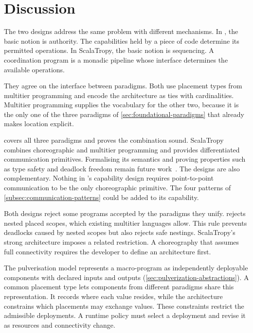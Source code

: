\section{Discussion}
\label{sec:language-coordination-discussion}

The two designs address the same problem with different mechanisms.
%
In \camil, the basic notion is authority.
The capabilities held by a piece of code determine its permitted operations.
%
In ScalaTropy, the basic notion is sequencing.
A coordination program is a monadic pipeline whose interface determines the available operations.

They agree on the interface between paradigms.
Both use placement types from multitier programming and encode the architecture as ties with cardinalities.
%
Multitier programming supplies the vocabulary for the other two,
because it is the only one of the three paradigms of \cref{sec:foundational-paradigms} that already makes location explicit.

\camil covers all three paradigms and proves the combination sound.
%
ScalaTropy combines choreographic and multitier programming and provides differentiated communication primitives.
Formalising its semantics and proving properties such as type safety and deadlock freedom remain future work~\cite{Farabegoli:2026:ScalaTropy}.
%
The designs are also complementary.
Nothing in \camil's capability design requires point-to-point communication to be the only choreographic primitive.
The four patterns of \cref{subsec:communication-patterns} could be added to its  capability.

Both designs reject some programs accepted by the paradigms they unify.
%
\camil rejects nested placed scopes, which existing multitier languages allow.
%
This rule prevents deadlocks caused by nested scopes but also rejects safe nestings.
%
ScalaTropy's strong architecture imposes a related restriction.
A choreography that assumes full connectivity requires the developer to define an architecture first.

The pulverisation model represents a macro-program as independently deployable components with declared inputs and outputs (\cref{sec:pulverization-abstractions}).
A common placement type lets components from different paradigms share this representation.
It records where each value resides, while the architecture constrains which placements may exchange values.
These constraints restrict the admissible deployments.
A runtime policy must select a deployment and revise it as resources and connectivity change.
